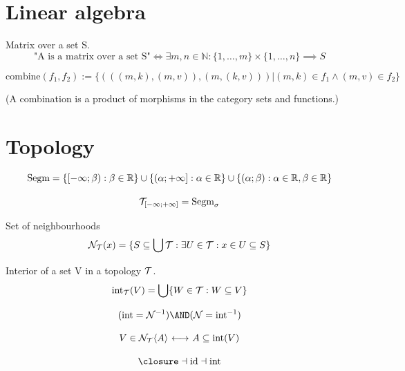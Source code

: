 \def\topic{}

\section{Linear algebra}
\begin{definition}Matrix over a set S.
\[
\mbox{"A is a matrix over a set S"}
\iff
\exists m, n \in \mathbb{N}: \{1,\dots,m\}\times \{1,\dots,n\} \implies S \]
\end{definition}

\begin{definition}
\[
\mbox{combine}(f_1,f_2) := \{(((m,k),(m,v)),(m,(k,v)))| (m,k)\in f_1 \land (m,v)\in f_2\}
\]
\end{definition}
(A combination is a product of morphisms in the category sets and functions.)

\section{Topology}
\begin{definition}
\[
\mbox{Segm} = \{[-\infty;\beta):\beta\in\mathbb{R}\}\cup \{(\alpha;+\infty]:\alpha\in\mathbb{R}\}\cup \{(\alpha;\beta):\alpha\in\mathbb{R},\beta\in\mathbb{R}\}
\]
\end{definition}
\begin{definition}
\[
\mathcal{T}_{[-\infty;+\infty]} = \mbox{Segm}_\sigma
\]
\end{definition}
\begin{definition}
Set of neighbourhoods
\[
\mathcal{N}_{\mathcal{T}}(x) = \{S \subseteq \bigcup \mathcal{T} : \exists  U\in \mathcal{T}: x\in U \subseteq S \}
\]
\end{definition}
\begin{definition}
Interior of a set V in a topology $\mathcal{T}$.
\[
\mathrm{int}_{\mathcal{T}}(V) = \bigcup
\{W\in \mathcal{T}: W\subseteq V\}
\]
\end{definition}
\begin{theorem}
\[
(\interior = \nghbset^{-1})\AND(\nghbset=\interior^{-1})
\]
\end{theorem}
\begin{theorem}
\[
V\in \mathcal{N}_{\mathcal{T}}\langle A\rangle {\ \longleftrightarrow\ } A \subseteq \mathrm{int}(V)
\]
\end{theorem}
\begin{theorem}
\[
\closure \dashv \mbox{id} \dashv \interior
\]
\end{theorem}

